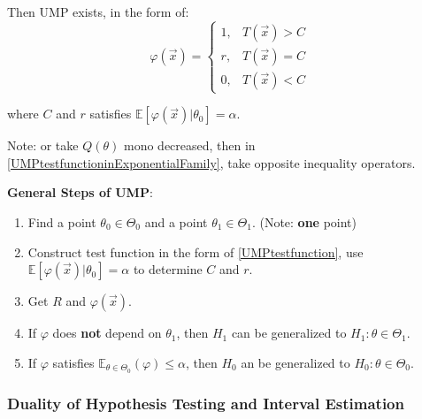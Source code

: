     Then UMP exists, in the form of:
    \begin{equation}\label{UMPtestfunctioninExponentialFamily}
            \varphi(\vec{x})=\begin{cases}
        1,&T(\vec{x})>C\\
        r,&T(\vec{x})=C\\
        0,&T(\vec{x})<C
    \end{cases} 
    \end{equation}
   
    

    where $C$ and $r$ satisfies $\mathbb{E}[\varphi(\vec{x})|\theta_0]=\alpha$.

    Note: or take $Q(\theta)$ mono decreased, then in \autoref{UMPtestfunctioninExponentialFamily}, take opposite inequality operators.
    
\begin{point}
    \textbf{General Steps of UMP}:
\end{point}

    
    \begin{enumerate}
        \item Find a point $\theta_0\in\Theta_0$ and a point $\theta_1\in\Theta_1$. (Note: \textbf{one} point)
        \item Construct test function in the form of {\autoref{UMPtestfunction}}, use $\mathbb{E}[\varphi(\vec{x})|\theta_0]=\alpha$ to determine $C$ and $r$.
        \item Get $R$ and $\varphi(\vec{x})$.
        \item If $\varphi$ does \textbf{not} depend on $\theta_1$, then $H_1$ can be generalized to $H_1:\theta\in\Theta_1$.
        \item If $\varphi$ satisfies $\mathbb{E}_{\theta\in\Theta_0}(\varphi)\leq\alpha$, then $H_0$ an be generalized to $H_0:\theta\in\Theta_0$.
    \end{enumerate}

\subsubsection{Duality of Hypothesis Testing and Interval Estimation}

